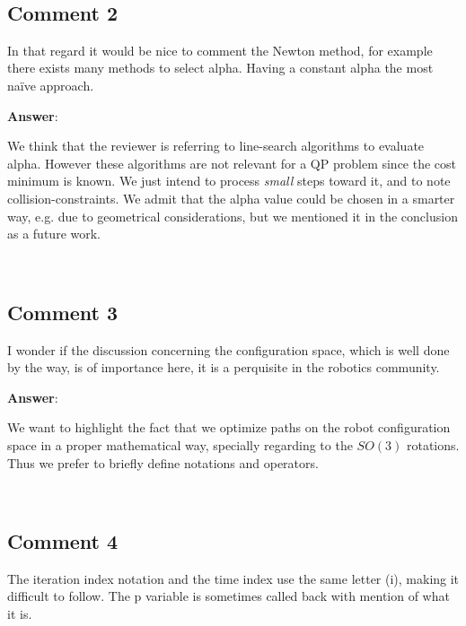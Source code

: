\documentclass{scrartcl}
\begin{document}
\noindent
\hrulefill\\

\subsection{Comment 2}

In that regard it would be nice to comment the Newton method, for example there exists many methods to select alpha. Having a constant alpha the most naïve approach.

\vspace{0.5cm}

\textbf{Answer}:

We think that the reviewer is referring to line-search algorithms to 
evaluate alpha. However these algorithms are not relevant for a QP problem since 
the cost minimum is known. We just intend to process \textit{small} steps toward it, and to note collision-constraints. We admit that the alpha value could be chosen in a smarter way, e.g. due to geometrical considerations, but we mentioned it in the conclusion as a future work.

\noindent
\hrulefill\\

\subsection{Comment 3}

I wonder if the discussion concerning the configuration space, which is well done by the way, is of importance here, it is a perquisite in the robotics community.

\vspace{0.5cm}

\textbf{Answer}:

We want to highlight the fact that we optimize paths on the robot 
configuration space in a proper mathematical way, specially regarding to the $SO(3)$ rotations. Thus we prefer to briefly define notations and operators.

\noindent
\hrulefill\\

\subsection{Comment 4}

The iteration index notation and the time index use the same letter (i), making it difficult to follow. The p variable is sometimes called back with mention of what it is.
\end{document}
